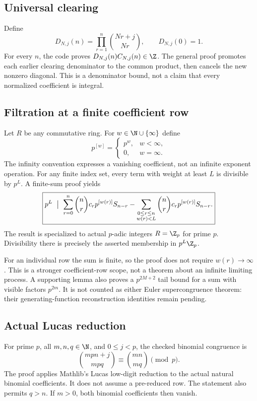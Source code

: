 \subsection*{Universal clearing}
Define
\[
 D_{N,j}(n)=\prod_{r=1}^{n}\binom{Nr+j}{Nr},\qquad D_{N,j}(0)=1.
\]
For every $n$, the code proves $D_{N,j}(n)C_{N,j}(n)\in\Z$. The general proof promotes each earlier clearing denominator to the common product, then cancels the new nonzero diagonal. This is a denominator bound, not a claim that every normalized coefficient is integral.
\par\medskip
{}
\subsection*{Filtration at a finite coefficient row}
Let $R$ be any commutative ring. For $w\in\N\cup\{\infty\}$ define
\[
 p^{[w]}=\begin{cases}p^w,&w<\infty,\\0,&w=\infty.\end{cases}
\]
The infinity convention expresses a vanishing coefficient, not an infinite exponent operation. For any finite index set, every term with weight at least $L$ is divisible by $p^L$. A finite-sum proof yields
\[
 \boxed{p^L\ \bigm|\ 
 \sum_{r=0}^{n}\binom nr c_rp^{[w(r)]}S_{n-r}
 -\sum_{\substack{0\le r\le n\\w(r)<L}}
     \binom nr c_rp^{[w(r)]}S_{n-r}.}
\]
The result is specialized to actual $p$-adic integers $R=\Z_p$ for prime $p$. Divisibility there is precisely the asserted membership in $p^L\Z_p$.

For an individual row the sum is finite, so the proof does not require $w(r)\to\infty$. This is a stronger coefficient-row scope, not a theorem about an infinite limiting process. A supporting lemma also proves a $p^{2M+2}$ tail bound for a sum with visible factors $p^{2m}$. It is not counted as either Euler supercongruence theorem: their generating-function reconstruction identities remain pending.

\subsection*{Actual Lucas reduction}
For prime $p$, all $m,n,q\in\N$, and $0\le j<p$, the checked binomial congruence is
\[
 \boxed{\binom{mpn+j}{mpq}\equiv\binom{mn}{mq}\pmod p.}
\]
The proof applies Mathlib's Lucas low-digit reduction to the actual natural binomial coefficients. It does not assume a pre-reduced row. The statement also permits $q>n$. If $m>0$, both binomial coefficients then vanish.

